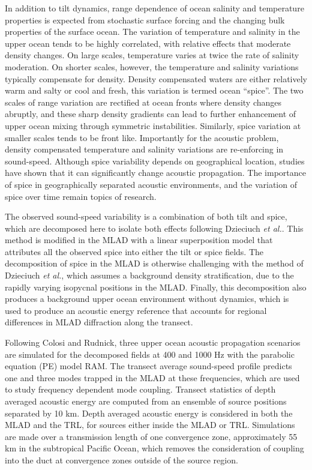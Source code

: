 \documentclass[preprint,NumberedRefs]{JASA}
\begin{document}
In addition to tilt dynamics, range dependence of ocean salinity and temperature properties is expected from stochastic surface forcing and the changing bulk properties of the surface ocean\citep{ferrari2000}. The variation of temperature and salinity in the upper ocean tends to be highly correlated, with relative effects that moderate density changes. On large scales, temperature varies at twice the rate of salinity moderation. On shorter scales, however, the temperature and salinity variations typically compensate for density. Density compensated waters are either relatively warm and salty or cool and fresh, this variation is termed ocean ``spice''\citep{munk1981evolution}. The two scales of range variation are rectified at ocean fronts where density changes abruptly, and these sharp density gradients can lead to further enhancement of upper ocean mixing through symmetric instabilities\citep{dasaro2011}. Similarly, spice variation at smaller scales tends to be front like.\cite{rudnick1999compensation} Importantly for the acoustic problem, density compensated temperature and salinity variations are re-enforcing in sound-speed. Although spice variability depends on geographical location, studies have shown that it can significantly change acoustic propagation.\citep{colosi12,colosi13,murat2021} The importance of spice in geographically separated acoustic environments, and the variation of spice over time remain topics of research.

The observed sound-speed variability is a combination of both tilt and spice, which are decomposed here to isolate both effects following Dzieciuch \emph{et al.}.\citep{dzieciuch2004} This method is modified in the MLAD with a linear superposition model that attributes all the observed spice into either the tilt or spice fields. The decomposition of spice in the MLAD is otherwise challenging with the method of Dzieciuch \emph{et al.},\cite{dzieciuch2004} which assumes a background density stratification, due to the rapidly varying isopycnal positions in the MLAD. Finally, this decomposition also produces a background upper ocean environment without dynamics, which is used to produce an acoustic energy reference that accounts for regional differences in MLAD diffraction along the transect.

Following Colosi and Rudnick,\cite{colosi2020observations} three upper ocean acoustic propagation scenarios are simulated for the decomposed fields at 400 and 1000 Hz with the parabolic equation (PE) model RAM\cite{collins93}. The transect average sound-speed profile predicts one and three modes trapped in the MLAD at these frequencies, which are used to study frequency dependent mode coupling. Transect statistics of depth averaged acoustic energy are computed from an ensemble of source positions separated by 10 km. Depth averaged acoustic energy is considered in both the MLAD and the TRL, for sources either inside the MLAD or TRL. Simulations are made over a transmission length of one convergence zone,\citep{jensen2011computational} approximately 55 km in the subtropical Pacific Ocean, which removes the consideration of coupling into the duct at convergence zones outside of the source region.\citep{colosi2020observations}
\end{document}
